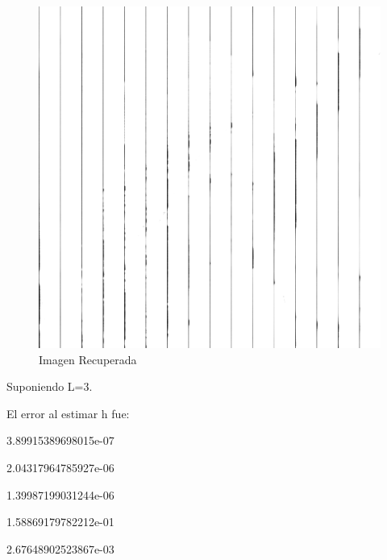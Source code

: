 \documentclass{article}
\begin{document}
\begin{multicols}{2}
\begin{figure}[H]
\centering
\includegraphics[scale=0.2]{../img/corrected_part5a.png}
\caption{Imagen Recuperada}

\end{figure}



\par \large{Suponiendo L=3.}

\par El error al estimar h fue:\\ 
\par   3.89915389698015e-07
\par   2.04317964785927e-06
\par   1.39987199031244e-06
\par   1.58869179782212e-01
\par   2.67648902523867e-03\\


\end{multicols}
\end{document}
